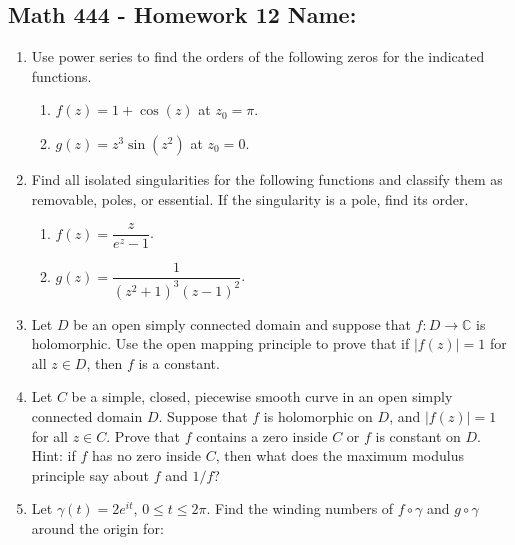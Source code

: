 \documentclass[11pt]{article}
\newcommand{\C}{\mathbb{C}}
\begin{document}
\pagestyle{empty}
\subsection*{Math 444 - Homework 12 \hfill Name: \underline{\hspace*{2in}}}
\noindent
\begin{enumerate}
\item Use power series to find the orders of the following zeros for the indicated functions.
\begin{multicols}{2}
\begin{enumerate}
\item $f(z) = 1 + \cos(z)$ at $z_0 = \pi$.

\item $g(z) = z^3\sin(z^2)$ at $z_0 = 0$. 
\end{enumerate}
\end{multicols}
\vfill


\item Find all isolated singularities for the following functions and classify them as removable, poles, or essential.  If the singularity is a pole, find its order. 
\begin{multicols}{2}
\begin{enumerate}
\item $f(z) = \dfrac{z}{e^z - 1}$.

\item $g(z) = \dfrac{1}{(z^2 + 1)^3 (z-1)^2}$. 
\end{enumerate}
\end{multicols}
\vfill

\item Let $D$ be an open simply connected domain and suppose that $f: D \rightarrow \C$ is holomorphic.  Use the open mapping principle to prove that if $|f(z)| = 1$ for all $z \in D$, then $f$ is a constant. 
\vfill

\item Let $C$ be a simple, closed, piecewise smooth curve in an open simply connected domain $D$.  Suppose that $f$ is holomorphic on $D$, and $|f(z)| = 1$ for all $z \in C$.  Prove that $f$ contains a zero inside $C$ or $f$ is constant on $D$.  Hint: if $f$ has no zero inside $C$, then what does the maximum modulus principle say about $f$ and $1/f$? 
\vfill


\newpage 
\item Let $\gamma(t) = 2 e^{it}$, $0 \le t \le 2\pi$.  Find the winding numbers of $f \circ \gamma$ and $g \circ \gamma$ around the origin for: 


\end{enumerate}
\end{document}
